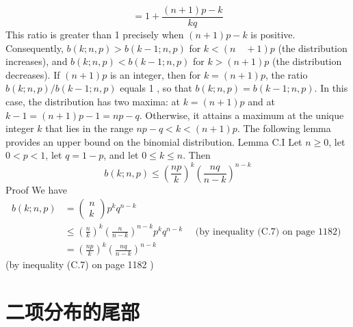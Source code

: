 \documentclass[lang=cn,newtx,10pt,scheme=chinese]{elegantbook}
\begin{document}
$$
=1+\frac{(n+1) p-k}{k q}
$$
This ratio is greater than 1 precisely when $(n+1) p-k$ is positive. Consequently, $b(k ; n, p)>b(k-1 ; n, p)$ for $k<(n \quad+1) p$ (the distribution increases), and $b(k ; n, p)<b(k-1 ; n, p)$ for $k>(n+1) p$ (the distribution decreases). If $(n+1) p$ is an integer, then for $k=(n+1) p$, the ratio $b(k ; n, p) / b(k-1 ; n, p)$ equals 1 , so that $b(k ; n, p)=b(k-1 ; n, p)$. In this case, the distribution has two maxima: at $k=(n+1) p$ and at $k-1=(n+1) p-1=n p-q$. Otherwise, it attains a maximum at the unique integer $k$ that lies in the range $n p-q<k<(n+1) p$. The following lemma provides an upper bound on the binomial distribution.
Lemma C.I
Let $n \geq 0$, let $0<p<1$, let $q=1-p$, and let $0 \leq k \leq n$. Then
$$
b(k ; n, p) \leq\left(\frac{n p}{k}\right)^k\left(\frac{n q}{n-k}\right)^{n-k}
$$
Proof We have
$$
\begin{aligned}
b(k ; n, p) & =\left(\begin{array}{l}
n \\
k
\end{array}\right) p^k q^{n-k} \\
& \leq\left(\frac{n}{k}\right)^k\left(\frac{n}{n-k}\right)^{n-k} p^k q^{n-k} \quad \text { (by inequality (C.7) on page 1182) } \\
& =\left(\frac{n p}{k}\right)^k\left(\frac{n q}{n-k}\right)^{n-k}
\end{aligned}
$$
(by inequality (C.7) on page 1182 )

\section{二项分布的尾部}
\end{document}
